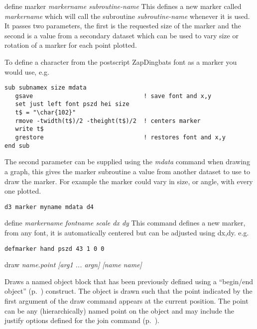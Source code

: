 \begin{commanddescription}
\item[{\sf define marker {\it markername  subroutine-name}}]
This defines a new marker called {\it markername} which will call
the subroutine {\it subroutine-name} whenever it is used.  It
passes two parameters, the first is the requested size of the
marker and the second is a value from a secondary dataset which
can be used to vary size or rotation of a marker for each point plotted.

To define a character from the postscript ZapDingbats font as a marker you
would use, e.g.

\begin{Verbatim}
sub subnamex size mdata
   gsave                               ! save font and x,y
   set just left font pszd hei size
   t$ = "\char{102}"
   rmove -twidth(t$)/2 -theight(t$)/2  ! centers marker
   write t$
   grestore                            ! restores font and x,y
end sub
\end{Verbatim}

The second parameter can be supplied using the {\it mdata} command
when drawing a graph,  this gives the marker subroutine a
value from another dataset to use to draw the marker.  For
example the marker could vary in size, or angle, with every
one plotted.

\begin{Verbatim}
d3 marker myname mdata d4
\end{Verbatim}

\item[{\sf define {\it markername  fontname scale dx dy}}]
This command defines a new marker, from any font, it is
automatically centered but can be adjusted using dx,dy. e.g.

\begin{Verbatim}
defmarker hand pszd 43 1 0 0
\end{Verbatim}

\item[{\sf draw {\it name.point [{\it arg1} ... {\it argn}] [name {\it name}]}}]
\label{cmd:draw}

Draws a named object block that has been previously defined using a ``begin/end object'' (p.~\pageref{cmd:beginobject}) construct. The object is drawn such that the point indicated by the first argument of the draw command appears at the current position. The point can be any (hierarchically) named point on the object and may include the justify options defined for the join command (p.~\pageref{cmd:join}).


\end{commanddescription}
